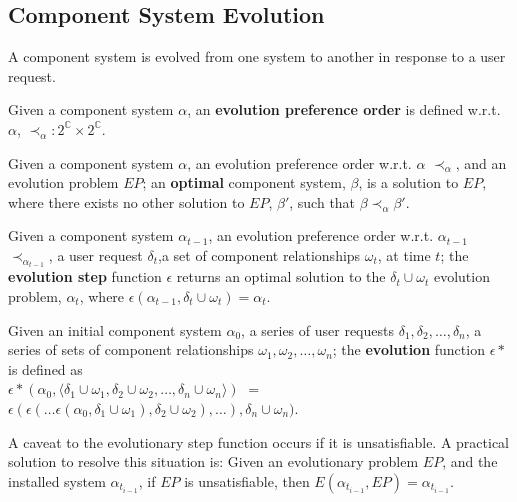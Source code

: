 \subsection{Component System Evolution}
\label{formal.evo}
A component system is evolved from one system to another in response to a user request.

\begin{defs}
Given a component system $\alpha$, an \textbf{evolution preference order} is defined w.r.t. $\alpha$,  $\prec_{\alpha}: 2^{\mathbb{C}} \times 2^{\mathbb{C}}$.
\end{defs}

\begin{defs}
Given a component system $\alpha$, an evolution preference order w.r.t. $\alpha$ $\prec_{\alpha}$, and an evolution problem $EP$;
an \textbf{optimal} component system, $\beta$, is a solution to $EP$, where there exists no other solution to $EP$, $\beta'$, such that $\beta \prec_{\alpha} \beta'$.   
\end{defs}

\begin{defs}
Given a component system $\alpha_{t-1}$, an evolution preference order w.r.t. $\alpha_{t-1}$ $\prec_{\alpha_{t-1}}$, 
a user request $\delta_t$,a set of component relationships $\omega_t$, at time $t$;
the \textbf{evolution step} function $\epsilon$ returns an optimal solution to the $\delta_t \cup \omega_t$ evolution problem, 
$\alpha_t$, where $\epsilon(\alpha_{t-1},\delta_t \cup \omega_t) = \alpha_t$.
\end{defs}

\begin{defs}
Given an initial component system $\alpha_{0}$, a series of user requests $\delta_1,\delta_2,\ldots,\delta_{n}$, a series of sets of component relationships $\omega_1,\omega_2,\ldots,\omega_{n}$;
the \textbf{evolution} function $\epsilon*$ is defined as\\
$\epsilon*(\alpha_0,\langle \delta_1 \cup \omega_1,\delta_2 \cup \omega_2,\ldots,\delta_{n} \cup \omega_n \rangle)$ $=$ $\epsilon(\epsilon(\ldots \epsilon(\alpha_0,\delta_1 \cup \omega_1),\delta_2 \cup \omega_2 ),\ldots),\delta_n \cup \omega_n)$.
\end{defs}

A caveat to the evolutionary step function occurs if it is unsatisfiable.
A practical solution to resolve this situation is:
Given an evolutionary problem $EP$, and the installed system $\alpha_{t_{i-1}}$, if $EP$ is unsatisfiable, then $E(\alpha_{t_{i-1}},EP) = \alpha_{t_{i-1}}$.

